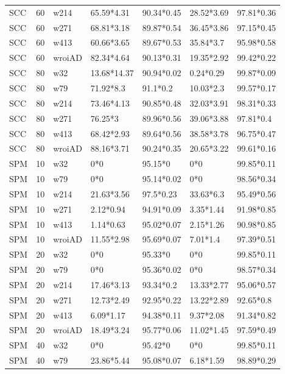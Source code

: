 \begin{table}[ht]
\begin{tabular}{lllllll}
  SCC & 60 & w214 & 65.59*4.31 & 90.34*0.45 & 28.52*3.69 & 97.81*0.36 \\ 
  SCC & 60 & w271 & 68.81*3.18 & 89.87*0.54 & 36.45*3.86 & 97.15*0.45 \\ 
  SCC & 60 & w413 & 60.66*3.65 & 89.67*0.53 & 35.84*3.7 & 95.98*0.58 \\ 
  SCC & 60 & wroiAD & 82.34*4.64 & 90.13*0.31 & 19.35*2.92 & 99.42*0.22 \\ 
  SCC & 80 & w32 & 13.68*14.37 & 90.94*0.02 & 0.24*0.29 & 99.87*0.09 \\ 
  SCC & 80 & w79 & 71.92*8.3 & 91.1*0.2 & 10.03*2.3 & 99.57*0.17 \\ 
  SCC & 80 & w214 & 73.46*4.13 & 90.85*0.48 & 32.03*3.91 & 98.31*0.33 \\ 
  SCC & 80 & w271 & 76.25*3 & 89.96*0.56 & 39.06*3.88 & 97.81*0.4 \\ 
  SCC & 80 & w413 & 68.42*2.93 & 89.64*0.56 & 38.58*3.78 & 96.75*0.47 \\ 
  SCC & 80 & wroiAD & 88.16*3.71 & 90.24*0.35 & 20.65*3.22 & 99.61*0.16 \\ 
  SPM & 10 & w32 & 0*0 & 95.15*0 & 0*0 & 99.85*0.11 \\ 
  SPM & 10 & w79 & 0*0 & 95.14*0.02 & 0*0 & 98.56*0.34 \\ 
  SPM & 10 & w214 & 21.63*3.56 & 97.5*0.23 & 33.63*6.3 & 95.49*0.56 \\ 
  SPM & 10 & w271 & 2.12*0.94 & 94.91*0.09 & 3.35*1.44 & 91.98*0.85 \\ 
  SPM & 10 & w413 & 1.14*0.63 & 95.02*0.07 & 2.15*1.26 & 90.98*0.85 \\ 
  SPM & 10 & wroiAD & 11.55*2.98 & 95.69*0.07 & 7.01*1.4 & 97.39*0.51 \\ 
  SPM & 20 & w32 & 0*0 & 95.33*0 & 0*0 & 99.85*0.11 \\ 
  SPM & 20 & w79 & 0*0 & 95.36*0.02 & 0*0 & 98.57*0.34 \\ 
  SPM & 20 & w214 & 17.46*3.13 & 93.34*0.2 & 13.33*2.77 & 95.06*0.57 \\ 
  SPM & 20 & w271 & 12.73*2.49 & 92.95*0.22 & 13.22*2.89 & 92.65*0.8 \\ 
  SPM & 20 & w413 & 6.09*1.17 & 94.38*0.11 & 9.37*2.08 & 91.34*0.82 \\ 
  SPM & 20 & wroiAD & 18.49*3.24 & 95.77*0.06 & 11.02*1.45 & 97.59*0.49 \\ 
  SPM & 40 & w32 & 0*0 & 95.42*0 & 0*0 & 99.85*0.11 \\ 
  SPM & 40 & w79 & 23.86*5.44 & 95.08*0.07 & 6.18*1.59 & 98.89*0.29 \\ 

\end{tabular}
\end{table}
